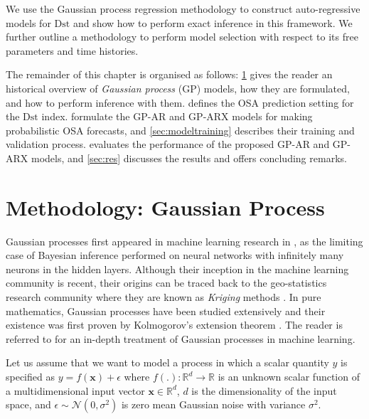 We use the Gaussian process regression methodology to construct auto-regressive models for 
$\mathrm{Dst}$ and show how to perform exact inference in this framework. We further outline a 
methodology to perform model selection with respect to its free parameters and time histories.

The remainder of this chapter is organised as follows: \cref{sec:osaGPmethod} gives the 
reader an historical overview of \emph{Gaussian process} (GP) models, how they are formulated, and 
how to perform inference with them.  defines the OSA prediction setting for the 
$\mathrm{Dst}$ index.  formulate the GP-AR and GP-ARX models for making 
probabilistic OSA forecasts, and \cref{sec:modeltraining} describes their training and validation 
process.  evaluates the performance of the proposed GP-AR and GP-ARX models, 
and \cref{sec:res} discusses the results and offers concluding remarks.

\section{Methodology: Gaussian Process} \label{sec:osaGPmethod}

Gaussian processes first appeared in machine learning research in \citet{Neal:1996:BLN:525544}, 
as the limiting case of Bayesian inference performed on neural networks with infinitely many 
neurons in the hidden layers. Although their inception in the machine learning community is recent, 
their origins can be traced back to the geo-statistics research community where they are known as 
\emph{Kriging} methods \citep{krige1951statistical}. In pure mathematics, Gaussian processes have 
been studied extensively and their existence was first proven by Kolmogorov's extension theorem 
\citep{tao2011introduction}. The reader is referred to \citet{Rasmussen:2005:GPM:1162254} for an 
in-depth treatment of Gaussian processes in machine learning.

Let us assume that we want to model a process in which a scalar quantity $y$ is specified as 
$y = f(\mathbf{x}) + \epsilon$ where   $f(.): \mathbb{R}^d \rightarrow \mathbb{R}$ is an unknown 
scalar function of a multidimensional input vector $\mathbf{x} \in \mathbb{R}^d$, $d$ is the 
dimensionality of the input space, and $\epsilon \sim \mathcal{N}(0, \sigma^2)$ is zero mean 
Gaussian noise with variance $\sigma^2$.

